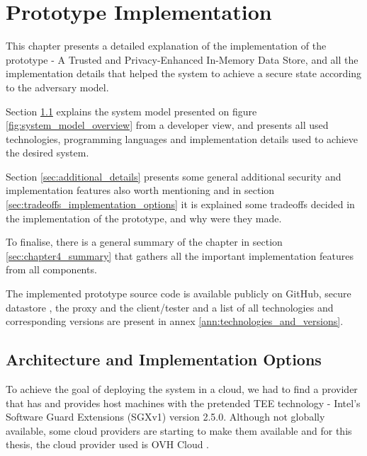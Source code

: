 
\chapter{Prototype Implementation}
\label{cha:prototype_implementation}

This chapter presents a detailed explanation of the implementation of the prototype - A Trusted and Privacy-Enhanced In-Memory Data Store, and all the implementation details that helped the system to achieve a secure state according to the adversary model.

Section \ref{sec:architecture_implementation_options} explains the system model presented on figure \ref{fig:system_model_overview} from a developer view, and presents all used technologies, programming languages and implementation details used to achieve the desired system.

Section \ref{sec:additional_details} presents some general additional security and implementation features also worth mentioning and in section \ref{sec:tradeoffs_implementation_options} it is explained some tradeoffs decided in the implementation of the prototype, and why were they made. 

To finalise, there is a general summary of the chapter in section \ref{sec:chapter4_summary} that gathers all the important implementation features from all components.

The implemented prototype source code is available publicly on GitHub, secure datastore \cite{thesis-repository:container}, the proxy \cite{thesis-repository:proxy} and the client/tester \cite{thesis-repository:client} and a list of all technologies and corresponding versions are present in annex \ref{ann:technologies_and_versions}.

\section{Architecture and Implementation Options}
\label{sec:architecture_implementation_options}

To achieve the goal of deploying the system in a cloud, we had to find a provider that has and provides host machines with the pretended \gls{TEE} technology - Intel's Software Guard Extensions (\gls{SGX}v1) version 2.5.0. Although not globally available, some cloud providers are starting to make them available and for this thesis, the cloud provider used is OVH Cloud \cite{ovhcloud:1}. 

